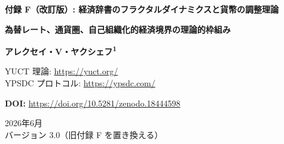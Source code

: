 \documentclass[12pt,a4paper]{article}
\theoremstyle{remark}
\begin{document}
	
	\begin{titlepage}
		\centering
		\vspace*{1cm}
		
		\Huge\textbf{付録 F（改訂版）: 経済辞書のフラクタルダイナミクスと貨幣の調整理論}
		
		\vspace{0.5cm}
		\Large\textbf{為替レート、通貨圏、自己組織化的経済境界の理論的枠組み}
		
		\vspace{1.5cm}
		
		\Large\textbf{アレクセイ・V・ヤクシェフ\textsuperscript{1}}
		
		YUCT 理論: \url{https://yuct.org/}\\
		YPSDC プロトコル: \url{https://ypsdc.com/}
		
		\vspace{2cm}
		\textbf{DOI:} \url{https://doi.org/10.5281/zenodo.18444598}
		
		\vspace{1cm}
		
		\large
		2026年6月 \\ \large バージョン 3.0（旧付録 F を置き換える）
		
		\vspace{2cm}
		
		\begin{minipage}{0.9\textwidth}
			\begin{abstract}
				\noindent
				本付録は、YUCT の経済学分野へのアプローチを根本的に見直すものである。我々は、GDP や市場ボラティリティを普遍指数 \(\beta = 0.67\) に当てはめようとする過去のすべての試みを放棄し、代わりに調整オントロジーに基づく第一原理からの理論的枠組みを構築する。経済は相互作用する \textbf{経済辞書}（企業、セクター、国家）のネットワークとしてモデル化され、各辞書は調整効率 \(K_{\mathrm{eff}}\) によって特徴付けられる。任意の二つの辞書間の境界は、マンデルブロ集合に類似したフラクタルダイナミクスを示すことを示す：自己相似性、複雑性、そして普遍誤差法則 \(\varepsilon = \kappa_c \alpha K_{\mathrm{eff}}^{-\beta}\) によって支配される。貨幣は辞書境界を越えた活性化を調整する \textbf{調整パラメータ} として定義され、従って為替レートは調整効率の比によって決定される。この枠組みは、いくつかの定量的で反証可能な予測を提供する：(1) 高頻度為替レート時系列のハースト指数は長い時間スケールで \(H \approx 1/\beta \approx 1.5\) に収束する；(2) 金融収益率のマルチフラクタルスペクトルは、一次代数サイクルによって決定される普遍的な左歪性を示す；(3) 為替レートのボラティリティ \(\sigma\) は、二つの辞書間の調整ギャップ \(\Delta K_{\mathrm{eff}}\) に対して \(\sigma \propto (\Delta K_{\mathrm{eff}})^{-0.67}\) でスケーリングする。本付録では実証的フィッティングは一切行わず、すべての予測は経済システムにおいて \(K_{\mathrm{eff}}\) の信頼できるプロキシが得られ次第テスト可能な形で定式化される。この作業は、YUCT 経済学を疑わしい相関の寄せ集めから、厳密で反証可能な研究プログラムへと転換する。
			\end{abstract}
		\end{minipage}
		

\end{titlepage}
\end{document}
